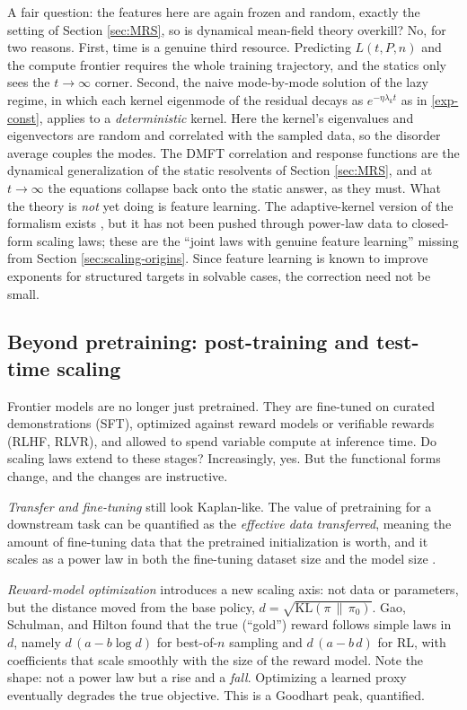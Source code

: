 \documentclass[11pt]{article}
\begin{document}
A fair question: the features here are again frozen and random, exactly the setting of Section \ref{sec:MRS}, so is dynamical mean-field theory overkill? No, for two reasons. First, time is a genuine third resource. Predicting $L(t,P,n)$ and the compute frontier requires the whole training trajectory, and the statics only sees the $t\to\infty$ corner. Second, the naive mode-by-mode solution of the lazy regime, in which each kernel eigenmode of the residual decays as $e^{-\eta\lambda_k t}$ as in \eqref{exp-const}, applies to a \emph{deterministic} kernel. Here the kernel's eigenvalues and eigenvectors are random and correlated with the sampled data, so the disorder average couples the modes. The DMFT correlation and response functions are the dynamical generalization of the static resolvents of Section \ref{sec:MRS}, and at $t\to\infty$ the equations collapse back onto the static answer, as they must. What the theory is \emph{not} yet doing is feature learning. The adaptive-kernel version of the formalism exists \cite{bordelon2022self}, but it has not been pushed through power-law data to closed-form scaling laws; these are the ``joint laws with genuine feature learning'' missing from Section \ref{sec:scaling-origins}. Since feature learning is known to improve exponents for structured targets in solvable cases, the correction need not be small.

\subsection{Beyond pretraining: post-training and test-time scaling}
\label{sec:scaling-posttraining}

Frontier models are no longer just pretrained. They are fine-tuned on curated demonstrations (SFT), optimized against reward models or verifiable rewards (RLHF, RLVR), and allowed to spend variable compute at inference time. Do scaling laws extend to these stages? Increasingly, yes. But the functional forms change, and the changes are instructive.

\emph{Transfer and fine-tuning} still look Kaplan-like. The value of pretraining for a downstream task can be quantified as the \emph{effective data transferred}, meaning the amount of fine-tuning data that the pretrained initialization is worth, and it scales as a power law in both the fine-tuning dataset size and the model size \cite{hernandez2021transfer}.

\emph{Reward-model optimization} introduces a new scaling axis: not data or parameters, but the distance moved from the base policy, $d = \sqrt{\mathrm{KL}(\pi \,\|\, \pi_0)}$. Gao, Schulman, and Hilton \cite{gao2023reward} found that the true (``gold'') reward follows simple laws in $d$, namely $d\,(a - b\log d)$ for best-of-$n$ sampling and $d\,(a - b\,d)$ for RL, with coefficients that scale smoothly with the size of the reward model. Note the shape: not a power law but a rise and a \emph{fall}. Optimizing a learned proxy eventually degrades the true objective. This is a Goodhart peak, quantified.
\end{document}
